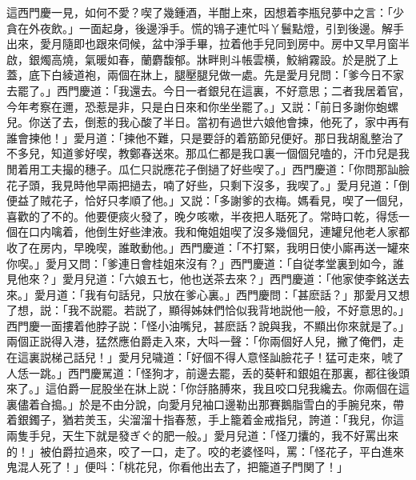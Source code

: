 這西門慶一見，如何不愛？喫了幾鍾酒，半酣上來，因想着李瓶兒夢中之言：「少貪在外夜飲。」一面起身，後邊淨手。慌的鴇子連忙呌丫鬟點燈，引到後邊。解手出來，愛月隨即也跟來伺候，盆中淨手畢，拉着他手兒同到房中。房中又早月窗半啟，銀燭高燒，氣暖如春，蘭麝馥郁。牀畔則斗帳雲横，鮫綃霧設。於是脱了上蓋，底下白綾道袍，兩個在牀上，腿壓腿兒做一處。先是愛月兒問：「爹今日不家去罷了。」西門慶道：「我還去。今日一者銀兒在這裏，不好意思；二者我居着官，今年考察在邇，恐惹是非，只是白日來和你坐坐罷了。」又説：「前日多謝你蚫螺兒。你送了去，倒惹的我心酸了半日。當初有過世六娘他會揀，他死了，家中再有誰會揀他！」愛月道：「揀他不難，只是要㧱的着筋節兒便好。那日我胡亂整治了不多兒，知道爹好喫，教鄭春送來。那瓜仁都是我口裏一個個兒嗑的，汗巾兒是我閒着用工夫撮的穗子。瓜仁只説應花子倒撾了好些喫了。」西門慶道：「你問那訕臉花子頭，我見時他早兩把撾去，喃了好些，只剩下沒多，我喫了。」愛月兒道：「倒便益了賊花子，恰好只孝順了他。」又説：「多謝爹的衣梅。媽看見，喫了一個兒，喜歡的了不的。他要便痰火發了，晚夕咳嗽，半夜把人聒死了。常時口乾，得恁一個在口内噙着，他倒生好些津液。我和俺姐姐喫了沒多幾個兒，連罐兒他老人家都收了在房内，早晚喫，誰敢動他。」西門慶道：「不打緊，我明日使小廝再送一罐來你喫。」愛月又問：「爹連日會桂姐來沒有？」西門慶道：「自従孝堂裏到如今，誰見他來？」愛月兒道：「六娘五七，他也送茶去來？」西門慶道：「他家使李銘送去來。」愛月道：「我有句話兒，只放在爹心裏。」西門慶問：「甚麽話？」那愛月又想了想，説：「我不説罷。若説了，顯得姊妹們恰似我背地説他一般，不好意思的。」西門慶一面摟着他脖子説：「怪小油嘴兒，甚麽話？說與我，不顯出你來就是了。」　兩個正説得入港，猛然應伯爵走入來，大呌一聲：「你兩個好人兒，撇了俺們，走在這裏説梯己話兒！」愛月兒噦道：「好個不得人意怪訕臉花子！猛可走來，唬了人恁一跳。」西門慶駡道：「怪狗才，前邊去罷，丢的葵軒和銀姐在那裏，都往後頭來了。」這伯爵一屁股坐在牀上説：「你㧱胳膊來，我且咬口兒我纔去。你兩個在這裏儘着㒲搗。」於是不由分說，向愛月兒袖口邊勒出那賽鵝脂雪白的手腕兒來，帶着銀鐲子，猶若羙玉，尖溜溜十指春葱，手上籠着金戒指兒，誇道：「我兒，你這兩隻手兒，天生下就是發ぎぐ的肥一般。」愛月兒道：「怪刀攮的，我不好罵出來的！」被伯爵拉過來，咬了一口，走了。咬的老婆怪呌，罵：「怪花子，平白進來鬼混人死了！」便呌：「桃花兒，你看他出去了，把籠道子門関了！」

